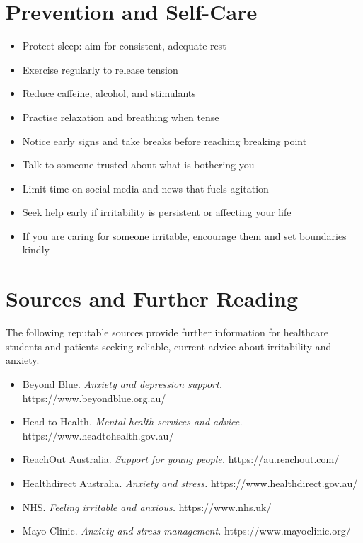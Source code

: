 \section*{Prevention and Self-Care}
\begin{itemize}
    \item Protect sleep: aim for consistent, adequate rest
    \item Exercise regularly to release tension
    \item Reduce caffeine, alcohol, and stimulants
    \item Practise relaxation and breathing when tense
    \item Notice early signs and take breaks before reaching breaking point
    \item Talk to someone trusted about what is bothering you
    \item Limit time on social media and news that fuels agitation
    \item Seek help early if irritability is persistent or affecting your life
    \item If you are caring for someone irritable, encourage them and set boundaries kindly
\end{itemize}

\section*{Sources and Further Reading}
The following reputable sources provide further information for healthcare students and patients seeking reliable, current advice about irritability and anxiety.
\begin{itemize}
    \item Beyond Blue. \textit{Anxiety and depression support.} https://www.beyondblue.org.au/
    \item Head to Health. \textit{Mental health services and advice.} https://www.headtohealth.gov.au/
    \item ReachOut Australia. \textit{Support for young people.} https://au.reachout.com/
    \item Healthdirect Australia. \textit{Anxiety and stress.} https://www.healthdirect.gov.au/
    \item NHS. \textit{Feeling irritable and anxious.} https://www.nhs.uk/
    \item Mayo Clinic. \textit{Anxiety and stress management.} https://www.mayoclinic.org/
\end{itemize}
